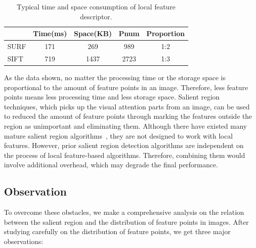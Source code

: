 \begin{table}[!t]
\begin{center}
\begin{tabular}{|l|c|c|c|c|}
\hline
 & Time(ms) & Space(KB) & Pnum & Proportion \\
\hline
SURF & 171 & 269 & 989   &  1:2\\\hline
SIFT & 719 & 1437 & 2723 & 1:3 \\\hline
\end{tabular}
\end{center}
\caption{Typical time and space consumption of local feature descriptor.}
\label{tab:surfandsift}
\end{table}

As the data shown, no matter the processing time or the storage space is proportional to the amount of feature points in an image. Therefore, less feature points means  less processing time and less storage space. Salient region techniques, which picks up the visual attention parts from an image, can be used to reduced the amount of feature points through marking the features outside the region as unimportant and eliminating them. Although there have existed many mature salient region algorithms~\cite{cheng2011global,achanta2009frequency,itti1998model}, they are not designed to work with local features. However, prior salient region detection algorithms are independent on the process of local feature-based algorithms. Therefore,  combining them would involve additional overhead, which may degrade the final performance.

\subsection{Observation}
\label{subsec:observation}

To overcome these obstacles, we make a comprehensive analysis on the relation between the salient region and the distribution of feature points  in images. After studying carefully on the distribution of feature points, we get three major observations:



